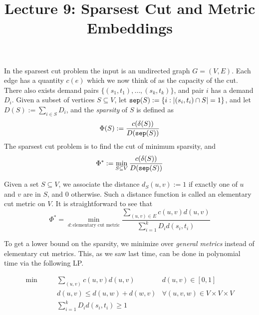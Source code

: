 \documentclass[11pt]{article}
\begin{document}
\title{Lecture 9: Sparsest Cut and Metric Embeddings}
\author{}
\date{}
\maketitle
\def\x{{x^{\tt int}}}
\def\E{{\mathbf E}}
\def\Pr{{\mathbf{Pr}}}
\noindent

\def\R{{\mathbb R}}
\def\sep{{\tt sep}}
In the sparsest cut problem the input is an undirected graph $G=(V,E)$. Each edge has a 
quantity $c(e)$ which we now think of as the capacity of the cut. There also exists demand
pairs $\{(s_1,t_1), \ldots, (s_k,t_k)\}$, and pair $i$ has a demand $D_i$.
Given a subset of vertices $S\subseteq V$, let 
$\sep(S) := \{i: |(s_i,t_i)\cap S| = 1\}$, and let $D(S) := \sum_{i\in S} D_i$, and
the {\em sparsity} of $S$ is defined as 
$$\Phi(S) := \frac{c(\delta(S))}{D(\sep(S))}$$
The sparsest cut problem is to find the cut of minimum sparsity, and $$\Phi^* := \min_{S\subseteq V} \frac{c(\delta(S))}{D(\sep(S))}$$
\medskip


Given a set $S\subseteq V$, we associate the 
distance $d_S(u,v) := 1$ if exactly one of $u$ and $v$ are in $S$, and $0$ otherwise. 
Such a distance function is called an elementary cut metric on $V$.
It is straightforward to see that 
\begin{equation}\label{eq:sparsitydefn}
\Phi^* = \min_{d: \textrm{elementary cut metric}} \frac{\sum_{(u,v)\in E} c(u,v)d(u,v)}{\sum_{i=1}^k D_id(s_i,t_i)}
\end{equation}
\noindent

To get a lower bound on the sparsity, we minimize over {\em general metrics} instead of elementary cut metrics.
This, as we saw last time, can be done in polynomial time via the following LP.

\begin{align}
\min & \qquad \sum_{(u,v)} c(u,v)d(u,v) & d(u,v)\in [0,1] \label{lp:sparsestcut}\\
				 & \qquad d(u,v) \le d(u,w) + d(w,v) & \forall (u,v,w) \in V\times V\times V \\
			      	& \qquad \sum_{i=1}^k D_i d(s_i,t_i) \ge 1 \label{eq:sparsest2}
\end{align}
\end{document}
